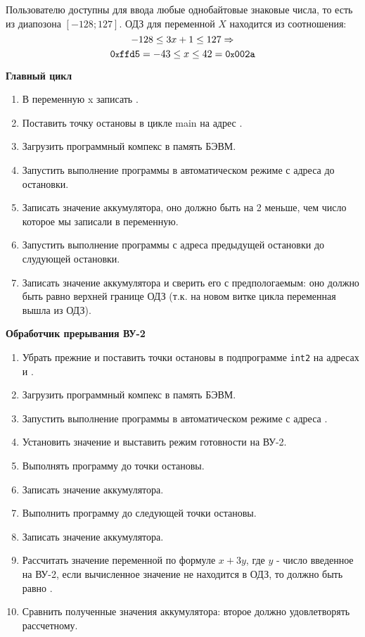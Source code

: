 
Пользователю доступны для ввода любые однобайтовые знаковые числа, то есть из диапозона $[-128;127]$. ОДЗ для переменной $X$ находится из соотношения:
$$-128\leq 3x+1 \leq 127 \Rightarrow $$
$$\texttt{0{\footnotesize{x}}ffd5}=-43 \leq x \leq 42 = \texttt{0{\footnotesize{x}}002a}$$

\textbf{Главный цикл}
\begin{enumerate}
    \item В переменную x записать .
\item Поставить точку остановы в цикле main на адрес .
\item Загрузить программный компекс в память БЭВМ.
\item Запустить выполнение программы в автоматическом режиме с адреса  до остановки.
\item Записать значение аккумулятора, оно должно быть на 2 меньше, чем число которое мы записали в переменную.
\item Запустить выполнение программы с адреса предыдущей остановки до слудующей остановки.
\item Записать значение аккумулятора и сверить его с предпологаемым: оно должно быть равно верхней границе ОДЗ  (т.к. на новом витке цикла переменная вышла из ОДЗ).
\end{enumerate}

\textbf{Обработчик прерывания ВУ-2}
\begin{enumerate}
\item Убрать прежние и поставить точки остановы в подпрограмме \verb|int2| на адресах  и .
\item Загрузить программный компекс в память БЭВМ.
\item Запустить выполнение программы в автоматическом режиме с адреса .
\item Установить значение и выставить режим готовности на ВУ-2.
\item Выполнять программу до точки остановы.
\item Записать значение аккумулятора.
\item Выполнить программу до следующей точки остановы.
\item Записать значение аккумулятора.
\item Рассчитать значение переменной по формуле $x+3y$, где $y$ - число введенное на ВУ-2, если вычисленное значение не находится в ОДЗ, то должно быть равно .
\item Сравнить полученные значения аккумулятора: второе должно удовлетворять рассчетному.
\end{enumerate}

